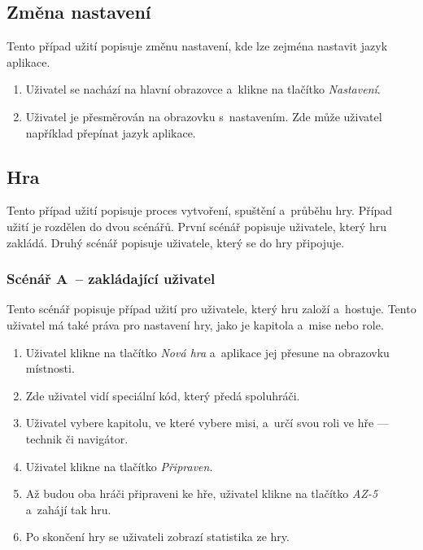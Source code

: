 \subsection{Změna nastavení}

Tento případ užití popisuje změnu nastavení,
kde lze zejména nastavit jazyk aplikace.

\begin{enumerate}
    \item Uživatel se nachází na hlavní obrazovce a~klikne na tlačítko
    \emph{Nastavení}.
    \item Uživatel je přesměrován na obrazovku s~nastavením.
    Zde může uživatel například přepínat jazyk aplikace.
\end{enumerate}

\subsection{Hra}

Tento případ užití popisuje proces vytvoření, spuštění a~průběhu hry.
Případ užití je rozdělen do dvou scénářů.
První scénář popisuje uživatele,
který hru zakládá.
Druhý scénář popisuje uživatele,
který se do hry připojuje.

\subsubsection*{Scénář A~-- zakládající uživatel}

Tento scénář popisuje případ užití pro uživatele,
který hru založí a~hostuje.
Tento uživatel má také práva pro nastavení hry,
jako je kapitola a~mise nebo role.

\begin{enumerate}
    \item Uživatel klikne na tlačítko \emph{Nová hra}
    a~aplikace jej přesune na obrazovku místnosti.
    \item Zde uživatel vidí speciální kód,
    který předá spoluhráči.
    \item Uživatel vybere kapitolu,
    ve které vybere misi,
    a~určí svou roli ve hře
    --- technik či navigátor.
    \item Uživatel klikne na tlačítko \emph{Připraven}.
    \item Až budou oba hráči připraveni ke hře,
    uživatel klikne na tlačítko \emph{AZ-5} a~zahájí tak hru.
    \item Po skončení hry se uživateli zobrazí statistika ze hry.
\end{enumerate}


